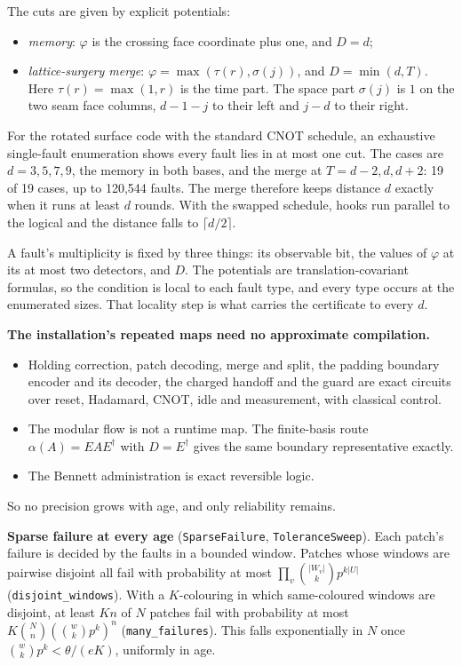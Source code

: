 \documentclass[
]{article}
\providecommand{\tightlist}{%
  \setlength{\itemsep}{0pt}\setlength{\parskip}{0pt}}
\begin{document}
The cuts are given by explicit potentials:

\begin{itemize}
\tightlist
\item
  \emph{memory}: \(\varphi\) is the crossing face coordinate plus one,
  and \(D=d\);
\item
  \emph{lattice-surgery merge}: \(\varphi=\max(\tau(r),\sigma(j))\), and
  \(D=\min(d,T)\). Here \(\tau(r)=\max(1,r)\) is the time part. The
  space part \(\sigma(j)\) is \(1\) on the two seam face columns,
  \(d-1-j\) to their left and \(j-d\) to their right.
\end{itemize}

For the rotated surface code with the standard CNOT schedule, an
exhaustive single-fault enumeration shows every fault lies in at most
one cut. The cases are \(d=3,5,7,9\), the memory in both bases, and the
merge at \(T=d-2,d,d+2\): 19 of 19 cases, up to 120,544 faults. The
merge therefore keeps distance \(d\) exactly when it runs at least \(d\)
rounds. With the swapped schedule, hooks run parallel to the logical and
the distance falls to \(\lceil d/2\rceil\).

A fault's multiplicity is fixed by three things: its observable bit, the
values of \(\varphi\) at its at most two detectors, and \(D\). The
potentials are translation-covariant formulas, so the condition is local
to each fault type, and every type occurs at the enumerated sizes. That
locality step is what carries the certificate to every \(d\).

\textbf{The installation's repeated maps need no approximate
compilation.}

\begin{itemize}
\tightlist
\item
  Holding correction, patch decoding, merge and split, the padding
  boundary encoder and its decoder, the charged handoff and the guard
  are exact circuits over reset, Hadamard, CNOT, idle and measurement,
  with classical control.
\item
  The modular flow is not a runtime map. The finite-basis route
  \(\alpha(A)=EAE^\dagger\) with \(D=E^\dagger\) gives the same boundary
  representative exactly.
\item
  The Bennett administration is exact reversible logic.
\end{itemize}

So no precision grows with age, and only reliability remains.

\textbf{Sparse failure at every age} (\texttt{SparseFailure},
\texttt{ToleranceSweep}). Each patch's failure is decided by the faults
in a bounded window. Patches whose windows are pairwise disjoint all
fail with probability at most \(\prod_v\binom{|W_v|}{k}p^{k|U|}\)
(\texttt{disjoint\_windows}). With a \(K\)-colouring in which
same-coloured windows are disjoint, at least \(Kn\) of \(N\) patches
fail with probability at most \(K\binom{N}{n}(\binom{w}{k}p^k)^n\)
(\texttt{many\_failures}). This falls exponentially in \(N\) once
\(\binom{w}{k}p^k<\theta/(eK)\), uniformly in age.
\end{document}

